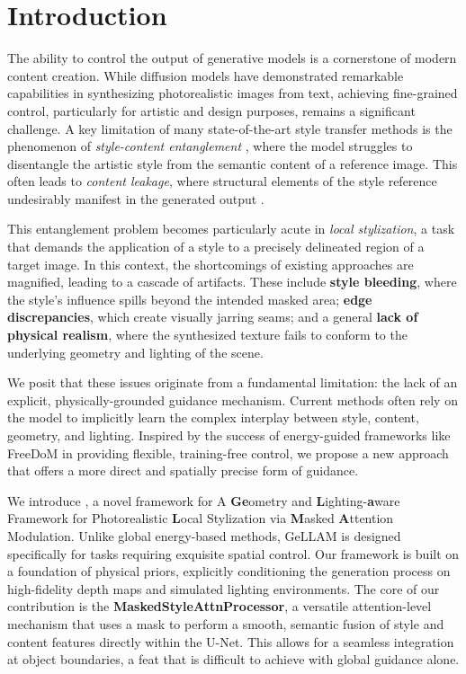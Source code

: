 \section{Introduction}

The ability to control the output of generative models is a cornerstone of modern content creation. While diffusion models have demonstrated remarkable capabilities in synthesizing photorealistic images from text, achieving fine-grained control, particularly for artistic and design purposes, remains a significant challenge. A key limitation of many state-of-the-art style transfer methods is the phenomenon of \textit{style-content entanglement} \cite{yang2024multiparty}, where the model struggles to disentangle the artistic style from the semantic content of a reference image. This often leads to \textit{content leakage}, where structural elements of the style reference undesirably manifest in the generated output \cite{wang2024instantstyle, xing2024csgo}.

This entanglement problem becomes particularly acute in \textit{local stylization}, a task that demands the application of a style to a precisely delineated region of a target image. In this context, the shortcomings of existing approaches are magnified, leading to a cascade of artifacts. These include \textbf{style bleeding}, where the style's influence spills beyond the intended masked area; \textbf{edge discrepancies}, which create visually jarring seams; and a general \textbf{lack of physical realism}, where the synthesized texture fails to conform to the underlying geometry and lighting of the scene.

We posit that these issues originate from a fundamental limitation: the lack of an explicit, physically-grounded guidance mechanism. Current methods often rely on the model to implicitly learn the complex interplay between style, content, geometry, and lighting. Inspired by the success of energy-guided frameworks like FreeDoM \cite{shi2023freedom} in providing flexible, training-free control, we propose a new approach that offers a more direct and spatially precise form of guidance.

We introduce \textbf{}, a novel framework for A \textbf{Ge}ometry and \textbf{L}ighting-\textbf{a}ware Framework for Photorealistic \textbf{L}ocal Stylization via \textbf{M}asked \textbf{A}ttention Modulation. Unlike global energy-based methods, GeLLAM is designed specifically for tasks requiring exquisite spatial control. Our framework is built on a foundation of physical priors, explicitly conditioning the generation process on high-fidelity depth maps and simulated lighting environments. The core of our contribution is the \textbf{MaskedStyleAttnProcessor}, a versatile attention-level mechanism that uses a mask to perform a smooth, semantic fusion of style and content features directly within the U-Net. This allows for a seamless integration at object boundaries, a feat that is difficult to achieve with global guidance alone.

